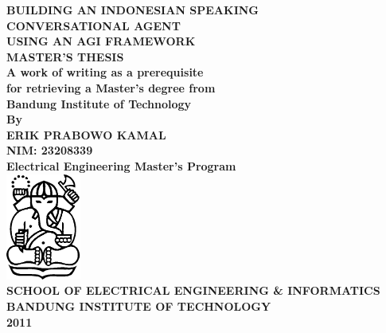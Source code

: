 \begin{titlepage}
  \begin{center}
    
    {\large\bfseries BUILDING AN INDONESIAN SPEAKING}\\[0.2cm]
    {\large\bfseries CONVERSATIONAL AGENT}\\[0.2cm]
    {\large\bfseries USING AN AGI FRAMEWORK}\\[2.5cm]
    
    {\large\bfseries MASTER'S THESIS}\\[0.2cm]
    {\large\bfseries A work of writing as a prerequisite}\\
    {\large\bfseries for retrieving a Master's degree from}\\
    {\large\bfseries Bandung Institute of Technology}\\[2.5cm]
    
    {\bfseries By}\\[0.2cm]
    {\large\bfseries ERIK PRABOWO KAMAL}\\[0.2cm]
    {\large\bfseries NIM: 23208339}\\[0.2cm]
    {\large\bfseries Electrical Engineering Master's Program}\\[2.5cm]
    
    \includegraphics[height=3.5cm]{Ganesha}\\[2.5cm]
    
    {\large\bfseries SCHOOL OF ELECTRICAL ENGINEERING \& INFORMATICS}\\
    {\large\bfseries BANDUNG INSTITUTE OF TECHNOLOGY}\\
    {\large\bfseries 2011}
    
  \end{center}
\end{titlepage}
